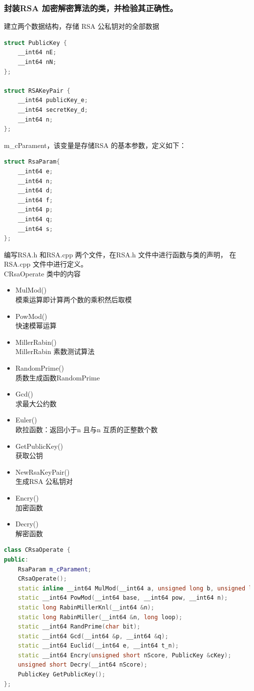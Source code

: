 \documentclass[UTF8,a4paper,10pt]{ctexart}
\begin{document}
\subsubsection{封装RSA 加密解密算法的类，并检验其正确性。}
建立两个数据结构，存储 RSA 公私钥对的全部数据
\begin{lstlisting}[language = c++]
struct PublicKey {
    __int64 nE;
    __int64 nN;
};

struct RSAKeyPair {
    __int64 publicKey_e;
    __int64 secretKey_d;
    __int64 n;
};
\end{lstlisting}
m\_cParament，该变量是存储RSA 的基本参数，定义如下：
\begin{lstlisting}[language = C++]
struct RsaParam{
    __int64 e;
    __int64 n;
    __int64 d;
    __int64 f;
    __int64 p;
    __int64 q;
    __int64 s;
};  
\end{lstlisting}
编写RSA.h 和RSA.cpp 两个文件，在RSA.h 文件中进行函数与类的声明，
在RSA.cpp 文件中进行定义。\\
CRsaOperate 类中的内容
\begin{itemize}
  \item MulMod()\\ 
  模乘运算即计算两个数的乘积然后取模
  \item PowMod()\\
  快速模幂运算
  \item MillerRabin()\\
  MillerRabin 素数测试算法
  \item RandomPrime() \\ 
  质数生成函数RandomPrime
  \item Gcd()\\ 
  求最大公约数
  \item Euler()\\
  欧拉函数：返回小于n 且与n 互质的正整数个数
  \item GetPublicKey()\\
  获取公钥
  \item NewRsaKeyPair()\\
  生成RSA 公私钥对
  \item Encry()\\
  加密函数
  \item Decry()\\
  解密函数
\end{itemize}

\begin{lstlisting}[language = c++]
class CRsaOperate {
public:
    RsaParam m_cParament;  
    CRsaOperate(); 
    static inline __int64 MulMod(__int64 a, unsigned long b, unsigned long n);
    static __int64 PowMod(__int64 base, __int64 pow, __int64 n);
    static long RabinMillerKnl(__int64 &n);
    static long RabinMiller(__int64 &n, long loop);
    static __int64 RandPrime(char bit);
    static __int64 Gcd(__int64 &p, __int64 &q);
    static __int64 Euclid(__int64 e, __int64 t_n);
    static __int64 Encry(unsigned short nScore, PublicKey &cKey);
    unsigned short Decry(__int64 nScore);
    PublicKey GetPublicKey();
};
\end{lstlisting}
\end{document}
